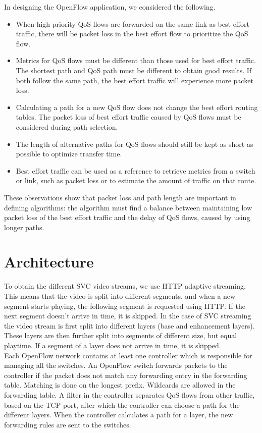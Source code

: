\documentclass[conference]{IEEEtran}
\begin{document}
In designing the OpenFlow application, we considered the following.
\begin{itemize}
	\item When high priority QoS flows are forwarded on the same link as best effort traffic, there will be packet loss in the best effort flow to prioritize the QoS flow.
	\item Metrics for QoS flows must be different than those used for best effort traffic. The shortest path and QoS path must be different to obtain good results. 
	If both follow the same path, the best effort traffic will experience more packet loss.
	\item Calculating a path for a new QoS flow does not change the best effort routing tables. The packet loss of best effort traffic caused by QoS flows must be considered during path selection.
	\item The length of alternative paths for QoS flows should still be kept as short as possible to optimize transfer time.
	\item Best effort traffic can be used as a reference to retrieve metrics from a switch or link, such as packet loss or to estimate the amount of traffic on that route.
\end{itemize}

These observations show that packet loss and path length are important in defining algorithms: 
the algorithm must find a balance between maintaining low packet loss of the best effort 
traffic and the delay of QoS flows, caused by using longer paths.\\

\section{Architecture}

To obtain the different SVC video streams, we use HTTP adaptive streaming.
This means that the video is split into different segments, and when a new segment starts playing, 
the following segment is requested using HTTP. 
If the next segment doesn't arrive in time, it is skipped.
In the case of SVC streaming the video stream is first split into different layers (base and enhancement layers).
These layers are then further split into segments of different size, but equal playtime.
If a segment of a layer does not arrive in time, it is skipped.\\

Each OpenFlow network contains at least one controller which is responsible for managing all the switches. 
An OpenFlow switch forwards packets 
to the controller if the packet does not match any forwarding entry in the forwarding table.
Matching is done on the longest prefix. Wildcards are allowed in the forwarding table.
A filter in the controller separates QoS flows from 
other traffic, based on the TCP port, after which the controller can choose a path for the different layers. 
When the controller calculates a path for a layer, the new forwarding rules are sent to the switches.\\
\end{document}
